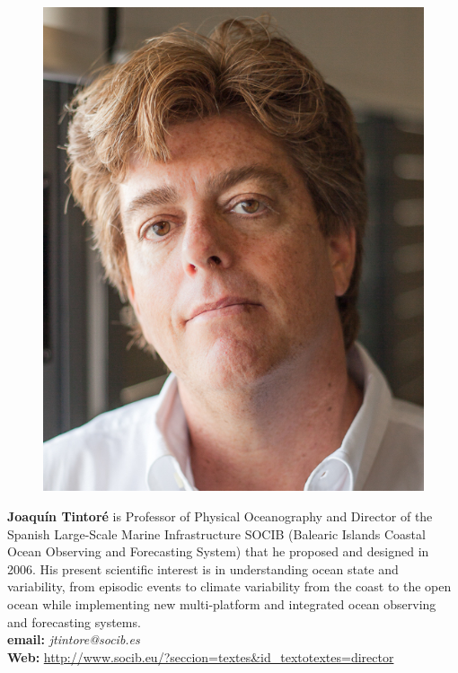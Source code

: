 {\vspace*{3cm}
\parbox{6.5in}{
\begin{figure} %
  \vspace{-\intextsep}
    \hspace*{-.35\columnsep}\includegraphics[scale=0.25]{fig/JTintore.jpeg}
\end{figure}

\textbf{Joaqu\'{i}n Tintor\'{e}} is Professor of Physical Oceanography
and Director of the Spanish Large-Scale Marine Infrastructure SOCIB
(Balearic Islands Coastal Ocean Observing and Forecasting System) that
he proposed and designed in 2006. His present scientific interest is
in understanding ocean state and variability, from episodic events to
climate variability from the coast to the open ocean while
implementing new multi-platform and integrated ocean observing and
forecasting systems.
\\
\textbf{email: }\emph{jtintore@socib.es} \\
\textbf{Web: }\url{http://www.socib.eu/?seccion=textes&id_textotextes=director} }
}
